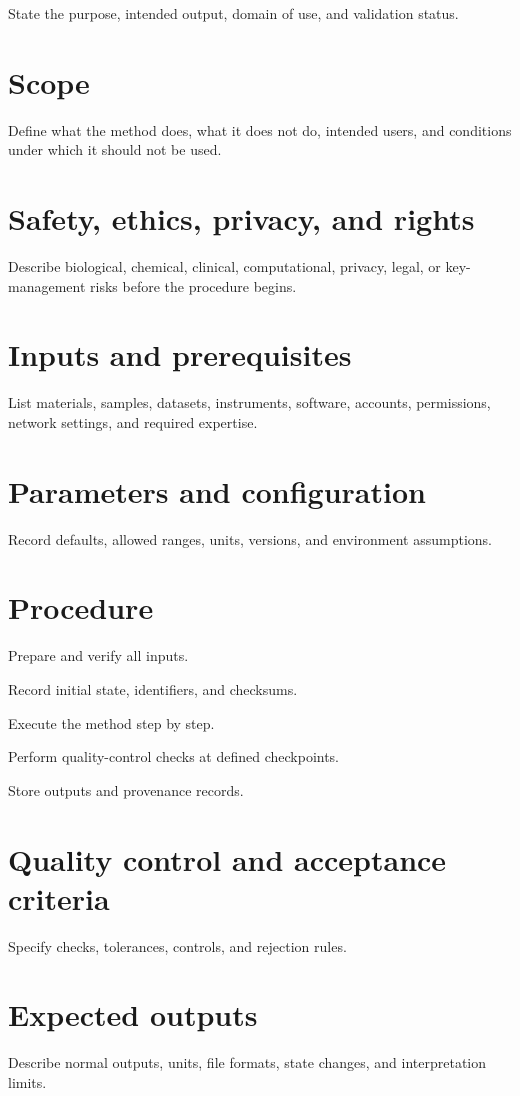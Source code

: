 \documentclass[11pt,a4paper]{article}
\begin{document}
\MakeGenesisTitle
\begin{GenesisAbstract}
State the purpose, intended output, domain of use, and validation status.
\end{GenesisAbstract}
\section{Scope}
Define what the method does, what it does not do, intended users, and conditions under
which it should not be used.
\section{Safety, ethics, privacy, and rights}
Describe biological, chemical, clinical, computational, privacy, legal, or key-management
risks before the procedure begins.
\section{Inputs and prerequisites}
List materials, samples, datasets, instruments, software, accounts, permissions, network
settings, and required expertise.
\section{Parameters and configuration}
Record defaults, allowed ranges, units, versions, and environment assumptions.
\section{Procedure}
\begin{GenesisProcedure}
\begin{genesissteps}
\item Prepare and verify all inputs.
\item Record initial state, identifiers, and checksums.
\item Execute the method step by step.
\item Perform quality-control checks at defined checkpoints.
\item Store outputs and provenance records.
\end{genesissteps}
\end{GenesisProcedure}
\section{Quality control and acceptance criteria}
Specify checks, tolerances, controls, and rejection rules.
\section{Expected outputs}
Describe normal outputs, units, file formats, state changes, and interpretation limits.
\end{document}
